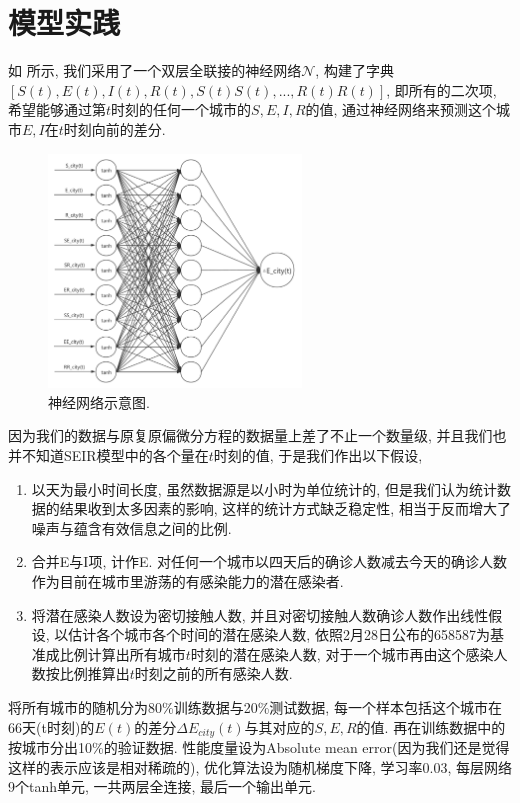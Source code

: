 \documentclass[lang=cn,11pt]{elegantpaper}
\begin{document}
\section{模型实践}

如 所示, 我们采用了一个双层全联接的神经网络$\mathcal N$, 构建了字典$[S(t),E(t),I(t),R(t),S(t)S(t),...,R(t)R(t)]$, 即所有的二次项, 希望能够通过第$t$时刻的任何一个城市的$S,E,I,R$的值, 通过神经网络来预测这个城市$E,I$在$t$时刻向前的差分. 

\begin{figure}[htbp]
  \centering
  \hspace{50pt}\includegraphics[width=0.6\textwidth]{sjwl}
  \caption{神经网络示意图. \label{fig:sjwl}}
\end{figure}

因为我们的数据与原复原偏微分方程的数据量上差了不止一个数量级, 并且我们也并不知道SEIR模型中的各个量在$t$时刻的值, 于是我们作出以下假设, 
\begin{enumerate}
	\item 以天为最小时间长度, 虽然数据源是以小时为单位统计的, 但是我们认为统计数据的结果收到太多因素的影响, 这样的统计方式缺乏稳定性, 相当于反而增大了噪声与蕴含有效信息之间的比例.
	\item 合并E与I项, 计作E. 对任何一个城市以四天后的确诊人数减去今天的确诊人数作为目前在城市里游荡的有感染能力的潜在感染者.
	\item 将潜在感染人数设为密切接触人数, 并且对密切接触人数确诊人数作出线性假设, 以估计各个城市各个时间的潜在感染人数, 依照2月28日公布的658587为基准成比例计算出所有城市$t$时刻的潜在感染人数, 对于一个城市再由这个感染人数按比例推算出$t$时刻之前的所有感染人数. 
\end{enumerate}

将所有城市的随机分为80\%训练数据与20\%测试数据, 每一个样本包括这个城市在66天(t时刻)的$E(t)$的差分$\Delta E_{city}(t)$与其对应的$S,E,R$的值. 再在训练数据中的按城市分出10\%的验证数据. 性能度量设为Absolute mean error(因为我们还是觉得这样的表示应该是相对稀疏的), 优化算法设为随机梯度下降, 学习率0.03, 每层网络9个tanh单元, 一共两层全连接, 最后一个输出单元.
\end{document}
